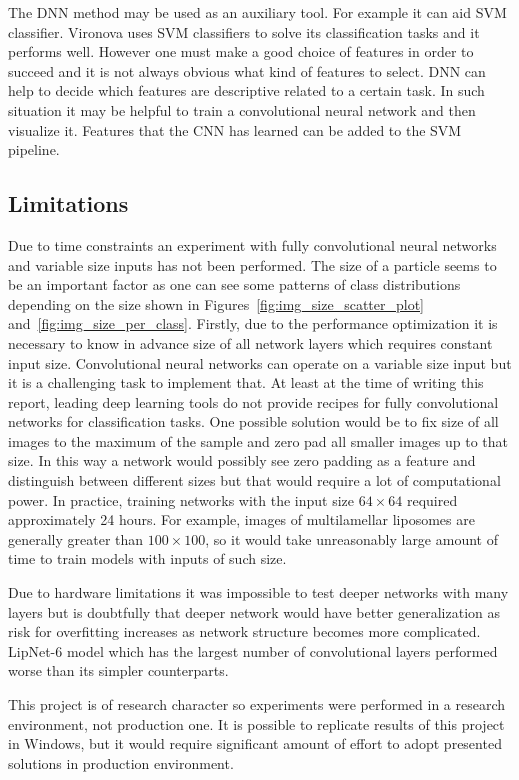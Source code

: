 \documentclass[a4paper, 11pt, table]{article}
\begin{document}
The DNN method may be used as an auxiliary tool. For example it can aid SVM classifier. Vironova uses SVM classifiers to solve its classification tasks and it performs well. However one must make a good choice of features in order to succeed and it is not always obvious what kind of features to select. DNN can help to decide which features are descriptive related to a certain task. In such situation it may be helpful to train a convolutional neural network and then visualize it. Features that the CNN has learned can be added to the SVM pipeline. 


\subsection{Limitations}

Due to time constraints an experiment with fully convolutional neural networks and variable size inputs has not been performed. The size of a particle seems to be an important factor as one can see some patterns of class distributions depending on the size shown in Figures~\ref{fig:img_size_scatter_plot} and~\ref{fig:img_size_per_class}. Firstly, due to the performance optimization it is necessary to know in advance size of all network layers which requires constant input size. Convolutional neural networks can operate on a variable size input but it is a challenging task to implement that. At least at the time of writing this report, leading deep learning tools do not provide recipes for fully convolutional networks for classification tasks. One possible solution would be to fix size of all images to the maximum of the sample and zero pad all smaller images up to that size. In this way a network would possibly see zero padding as a feature and distinguish between different sizes but that would require a lot of computational power. In practice, training networks with the input size $64 \times 64$ required approximately 24 hours. For example, images of multilamellar liposomes are generally greater than $100 \times 100$, so it would take unreasonably large amount of time to train models with inputs of such size. 

Due to hardware limitations it was impossible to test deeper networks with many layers but is doubtfully that deeper network would have better generalization as risk for overfitting increases as network structure becomes more complicated. LipNet-6 model which has the largest number of convolutional layers performed worse than its simpler counterparts.

This project is of research character so experiments were performed in a research environment, not production one. It is possible to replicate results of this project in Windows, but it would require significant amount of effort to adopt presented solutions in production environment.
\end{document}
